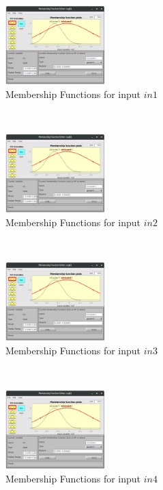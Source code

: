 \documentclass[11pt]{article}
\begin{document}
\begin{figure}[ht]
	\centering
	\begin{subfigure}[t]{0.3\textwidth}
		\centering
		\includegraphics[height=1.2in]{images/subtractive_hybrid_in1}
		\caption{Membership Functions for input $in1$}
	\end{subfigure}
	~ 
	\begin{subfigure}[t]{0.3\textwidth}
		\centering
		\includegraphics[height=1.2in]{images/subtractive_hybrid_in1}
		\caption{Membership Functions for input $in2$}
	\end{subfigure}
	~
	\begin{subfigure}[t]{0.3\textwidth}
		\centering
		\includegraphics[height=1.2in]{images/subtractive_hybrid_in1}
		\caption{Membership Functions for input $in3$}
	\end{subfigure}
	\\
	\begin{subfigure}[t]{0.3\textwidth}
		\centering
		\includegraphics[height=1.2in]{images/subtractive_hybrid_in1}
		\caption{Membership Functions for input $in4$}
	\end{subfigure}
	~ 
	\begin{subfigure}[t]{0.3\textwidth}

\end{subfigure}
\end{figure}
\end{document}
